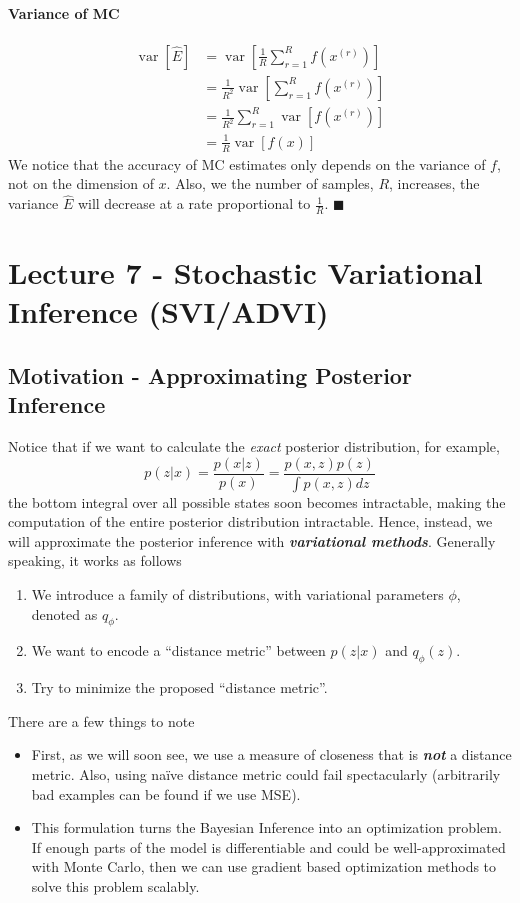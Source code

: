 \documentclass[11pt]{article}
\newcommand{\qed}{\hfill $\blacksquare$}
\begin{document}
\paragraph{Variance of MC}
\begin{align}
    \operatorname{var}[\hat{E}]
    &=\operatorname{var}\left[\frac{1}{R} \sum_{r=1}^{R} f\left(x^{(r)}\right)\right] \\
    &= \frac{1}{R^{2}} \operatorname{var}\left[\sum_{r=1}^{R} f\left(x^{(r)}\right)\right] \\
    &= \frac{1}{R^{2}} \sum_{r=1}^{R} \operatorname{var}\left[f\left(x^{(r)}\right)\right]\\
    &= \frac{1}{R}\operatorname{var}\left[f(x) \right]
\end{align}
We notice that the accuracy of MC estimates only depends on the variance of $f$, not on the dimension of $x$. Also, we the number of samples, $R$, increases, the variance $\hat{E}$ will decrease at a rate proportional to $\frac{1}{R}$.
\qed


\section{Lecture 7 - Stochastic Variational Inference (SVI/ADVI)}
\subsection{Motivation - Approximating Posterior Inference}
Notice that if we want to calculate the \textit{exact} posterior distribution, for example, 
\begin{equation}
    p(z | x)=\frac{p(x | z)}{p(x)}=\frac{p(x, z) p(z)}{\int p(x, z) dz}
\end{equation} 
the bottom integral over all possible states soon becomes intractable, making the computation of the entire posterior distribution intractable. Hence, instead, we will approximate the posterior inference with \textit{\textbf{variational methods}}. Generally speaking, it works as follows
\begin{enumerate}
    \item We introduce a family of distributions, with variational parameters $\phi$, denoted as $q_\phi$. 
    \item We want to encode a ``distance metric'' between $p(z|x)$ and $q_\phi(z)$.
    \item Try to minimize the proposed ``distance metric''.
\end{enumerate}
There are a few things to note
\begin{itemize}
    \item First, as we will soon see, we use a measure of closeness that is \textit{\textbf{not}} a distance metric. Also, using na\"ive distance metric could fail spectacularly (arbitrarily bad examples can be found if we use MSE).
    \item This formulation turns the Bayesian Inference into an optimization problem. If enough parts of the model is differentiable and could be well-approximated with Monte  Carlo, then we can use gradient based optimization methods to solve this problem scalably. 
\end{itemize}
\end{document}
